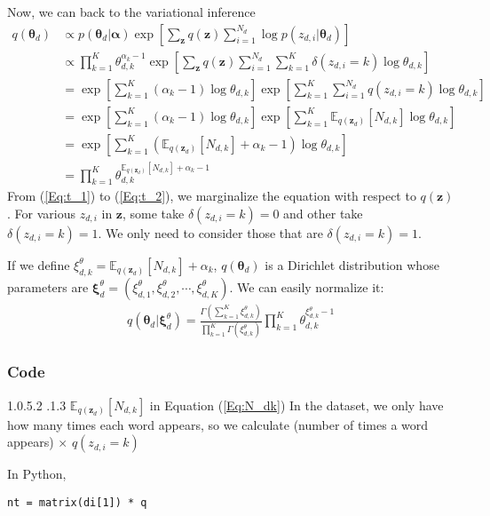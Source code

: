 \documentclass[a4paper,10.5pt,dvipdfmx]{jarticle}  %
\makeatletter
\newcommand{\subsubsubsection}{\@startsection{paragraph}{4}{\z@}%
    {1.0\Cvs \@plus.5\Cdp \@minus.2\Cdp}%
    {.1\Cvs \@plus.3\Cdp}%
    {\reset@font\normalsize}
  }
\makeatother
\begin{document}
Now, we can back to the variational inference
\begin{align}
	q(\boldsymbol{\theta}_d) &\propto p(\boldsymbol{\theta}_d | \boldsymbol{\alpha}) \exp \left[ \sum_{\boldsymbol{z}} q(\boldsymbol{z}) \sum_{i=1}^{N_d} \log p(z_{d,i} | \boldsymbol{\theta}_d) \right]\\
 &\propto \prod_{k=1}^{K} \theta_{d,k}^{\alpha_k -1} \exp \left[ \sum_{\boldsymbol{z}} q(\boldsymbol{z}) \sum_{i=1}^{N_d} \sum_{k=1}^{K} \delta({z_{d,i} = k}) \log \theta_{d,k} \right] \label{Eq:t_1} \\
&= \exp \left[ \sum_{k=1}^{K} (\alpha_k -1) \log \theta_{d,k} \right] \exp \left[ \sum_{k=1}^{K} \sum_{i=1}^{N_d} q(z_{d,i} = k) \log \theta_{d,k} \right] \label{Eq:t_2} \\
&= \exp \left[\sum_{k=1}^{K} (\alpha_k -1) \log \theta_{d,k}  \right] \exp \left[ \sum_{k=1}^{K} \mathbb{E}_{q(\boldsymbol{z}_d)}[N_{d,k}]  \log \theta_{d,k} \right] \\
&= \exp \left[ \sum_{k=1}^{K} (\mathbb{E}_{q(\boldsymbol{z}_d)}[N_{d,k}] + \alpha_k -1) \log \theta_{d,k} \right]\\
&= \prod_{k=1}^{K} \theta_{d,k}^{\mathbb{E}_{q(\boldsymbol{z}_d)}[N_{d,k}] + \alpha_k -1}
\end{align}
From (\ref{Eq:t_1}) to (\ref{Eq:t_2}), we marginalize the equation with respect to $q(\boldsymbol{z})$. For various $z_{d,i}$ in $\boldsymbol{z}$, some take $\delta({z_{d,i} = k})=0$ and other take $\delta({z_{d,i} = k})=1$. We only need to consider those that are $\delta({z_{d,i} = k})=1$. \par
If we define $\xi_{d,k}^{\theta} = \mathbb{E}_{q(\boldsymbol{z}_d)}[N_{d,k}] + \alpha_k$, $q(\boldsymbol{\theta}_d)$ is a Dirichlet distribution whose parameters are $\boldsymbol{\xi}_{d}^{\theta} = (\xi_{d,1}^{\theta}, \xi_{d,2}^{\theta}, \cdots, \xi_{d,K}^{\theta})$. We can easily normalize it:
\begin{align}
  q(\boldsymbol{\theta}_d | \boldsymbol{\xi}_{d}^{\theta}) = \frac{\Gamma (\sum_{k=1}^{K} \xi_{d,k}^{\theta})}{\prod_{k=1}^{K} \Gamma(\xi_{d,k}^{\theta})} \prod_{k=1}^{K} \theta_{d,k}^{\xi_{d,k}^{\theta} -1} \label{Eq:normalizeTheta}
\end{align}


\subsubsection{Code}
\subsubsubsection{$\mathbb{E}_{q(\boldsymbol{z}_d)}[N_{d,k}]$ in Equation (\ref{Eq:N_dk})}
In the dataset, we only have how many times each word appears, so we calculate (number of times a word appears) $\times$ $q(z_{d,i}=k)$\par
In Python,
\begin{lstlisting}[style=Python]
nt = matrix(di[1]) * q
\end{lstlisting}
\end{document}
